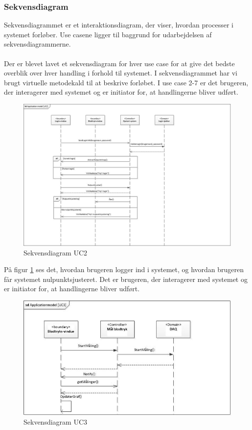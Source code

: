 \subsubsection{Sekvensdiagram}
Sekvensdiagrammet er et interaktionsdiagram, der viser, hvordan processer i systemet forløber. Use casene ligger til baggrund for udarbejdelsen af sekvensdiagrammerne.\\ \\
Der er blevet lavet et sekvensdiagram for hver use case for at give det bedste overblik over hver handling i forhold til systemet. I sekvensdiagrammet har vi brugt virtuelle metodekald til at beskrive forløbet. I use case 2-7 er det brugeren, der interagerer med systemet og er initiator for, at handlingerne bliver udført.

\begin{figure}[H]
	\centering
	\includegraphics[width=1\textwidth]{Figurer/ISE/sdAppModelUC2}
	\caption{Sekvensdiagram UC2}
	\label{sd UC2}
\end{figure}

På figur \ref{sd UC2} ses det, hvordan brugeren logger ind i systemet, og hvordan brugeren får systemet nulpunktsjusteret. Det er brugeren, der interagerer med systemet og er initiator for, at handlingerne bliver udført. 

\begin{figure}[H]
	\includegraphics[width=1\textwidth]{Figurer/ISE/sdAppModelUC3}
	\caption{Sekvensdiagram UC3}
	\label{sd UC3}
\end{figure}

